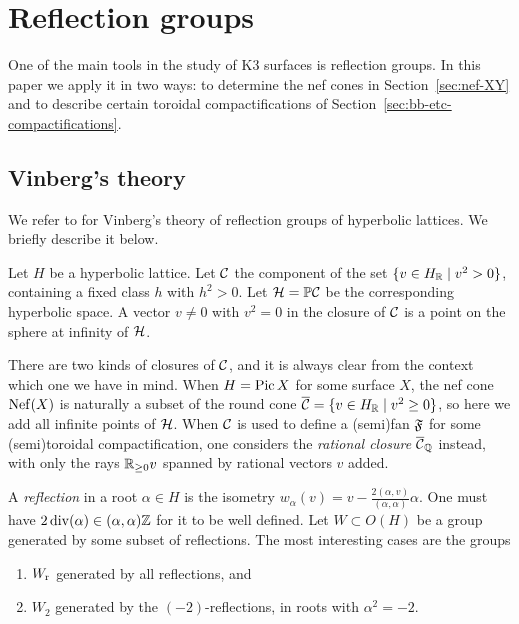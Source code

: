 \documentclass{amsart}
\begin{document}
\section{Reflection groups}
\label{sec:reflection-groups}

One of the main tools in the study of K3 surfaces is reflection
groups. In this paper we apply it in two ways: to determine the nef
cones in Section~\ref{sec:nef-XY} and to describe certain toroidal
compactifications of Section~\ref{sec:bb-etc-compactifications}.

\subsection{Vinberg's theory}
\label{sec:vinberg-theory}

We refer to \cite{vinberg1973some-arithmetic,
  vinberg1972-groups-of-units} for Vinberg's theory of reflection
groups of hyperbolic lattices. We briefly describe it below.

\smallskip

Let $H$ be a hyperbolic lattice. Let ${\mathcal C}$ the component of the set 
$\{ v\in H_{\mathbb R} \mid v^2>0\}$, containing a fixed class $h$ with
$h^2>0$. Let ${\mathcal H}={\mathbb P}{\mathcal C}$ be the corresponding hyperbolic space.
A vector $v\ne0$ with $v^2=0$ in the closure of ${\mathcal C}$ is a point on
the sphere at infinity of ${\mathcal H}$. 

There are two kinds of closures of ${\mathcal C}$, and it is always clear from the
context which one we have in mind. When $H=\operatorname{Pic} X$ for some surface
$X$, the nef cone $\operatorname{Nef}(X)$ is naturally a subset of the round cone
$\overline{{\mathcal C}} = \{ v\in H_{\mathbb R} \mid v^2\ge0\}$, so here we add all infinite
points of ${\mathcal H}$.  When ${\mathcal C}$ is used to define a (semi)fan ${\mathfrak F}$ for
some (semi)toroidal compactification, one considers the \emph{rational
  closure} $\overline{{\mathcal C}}_{{\mathbb Q}}$ instead, with only the rays ${\mathbb R}_{\ge0}v$ spanned by
rational vectors $v$ added.

A \emph{reflection} in a root $\alpha\in H$ is the isometry
$w_\alpha(v) = v - \frac{2(\alpha,v)}{(\alpha,\alpha)} \alpha$.  One
must have $2\operatorname{div}(\alpha)\in(\alpha,\alpha) {\mathbb Z}$ for it to be
well defined.
Let $W\subset O(H)$ be a group generated by some subset of
reflections. The most interesting cases are the groups
\begin{enumerate}
\item $W_{\rm r}$ generated by all reflections, and \vspace{1pt}
\item $W_2$ generated by the $(-2)$-reflections, in roots with
  $\alpha^2=-2$. 
\end{enumerate}
\end{document}
